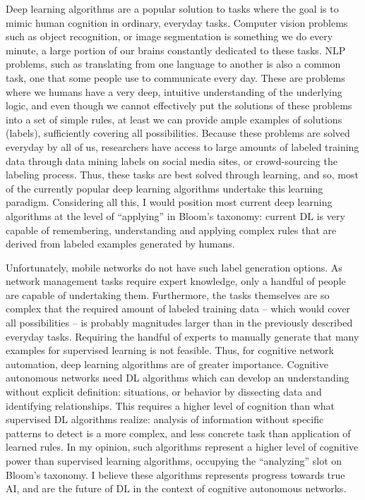 			Deep learning algorithms are a popular solution to tasks where the goal is to mimic human cognition in ordinary, everyday tasks.
			Computer vision problems such as object recognition, or image segmentation is something we do every minute, a large portion of our brains constantly dedicated to these tasks.
			\ac{NLP} problems, such as translating from one language to another is also a common task, one that some people use to communicate every day.
			These are problems where we humans have a very deep, intuitive understanding of the underlying logic, and even though we cannot effectively put the solutions of these problems into a set of simple rules, at least we can provide ample examples of solutions (labels), sufficiently covering all possibilities.
			Because these problems are solved everyday by all of us, researchers have access to large amounts of labeled training data through data mining labels on social media sites, or crowd-sourcing the labeling process.
			Thus, these tasks are best solved through  learning, and so, most of the currently popular deep learning algorithms undertake this learning paradigm.
			Considering all this, I would position most current deep learning algorithms at the level of ``applying'' in Bloom's taxonomy: current \ac{DL} is very capable of remembering, understanding and applying complex rules that are derived from labeled examples generated by humans.
		
			Unfortunately, mobile networks do not have such label generation options.
			As network management tasks require expert knowledge, only a handful of people are capable of undertaking them.
			Furthermore, the tasks themselves are so complex that the required amount of labeled training data -- which would cover all possibilities -- is probably magnitudes larger than in the previously described everyday tasks.
			Requiring the handful of experts to manually generate that many examples for supervised learning is not feasible.
			Thus, for cognitive network automation,  deep learning algorithms are of greater importance.
			Cognitive autonomous networks need \ac{DL} algorithms which can develop an understanding without explicit definition:  situations, or behavior by dissecting data and identifying relationships.
			This requires a higher level of cognition than what supervised \ac{DL} algorithms realize: analysis of information without specific patterns to detect is a more complex, and less concrete task than application of learned rules.
			In my opinion, such algorithms represent a higher level of cognitive power than supervised learning algorithms, occupying the ``analyzing'' slot on Bloom's taxonomy.
			I believe these algorithms represents progress towards true \ac{AI}, and are the future of \ac{DL} in the context of cognitive autonomous networks.
			
